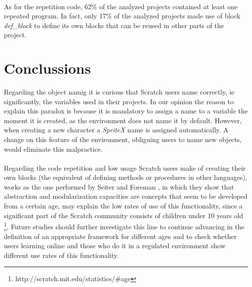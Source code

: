 \documentclass[a4paper,10pt]{article}
\begin{document}
\paragraph{}As for the repetition code, 62\% of the analyzed projects contained at least one repeated program. In fact, only 17\% of the analyzed projects made use of block \textit{def\_block} to define its own blocks that can be reused in other parts of the project. 

\section{Conclussions}

\paragraph{}Regarding the object namig it is curious that Scratch users name correctly, ie significantly, the variables used in their projects. In our opinion the reason to explain this paradox is because it is mandatory to assign a name to a variable the moment it is created, as the environment does not name it by default. However, when creating a new character a  \textit{SpriteX} name is assigned automatically. A change on this feature of the environment, obliguing users to name new objects, would eliminate this malpractice.
\paragraph{}Regarding the code repetition and low usage Scratch users make of creating their own blocks (the equivalent of defining methods or procedures in other languages), works as the one performed by Seiter and Foreman \cite {seiter2013modeling}, in which they show that abstraction and modularization capacities are concepts that seem to be developed from a certain age, may explain the low rates of use of this functionality, since a significant part of the Scratch community consists of children under 10 years old \footnote{http://scratch.mit.edu/statistics/\#age}. Future studies should further investigate this line to continue advancing in the definition of an appropriate framework for different ages and to check whether users learning online and those who do it in a regulated environment show different use rates of this functionality.

\newpage


\end{document}
